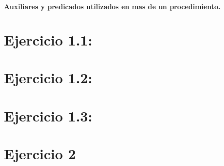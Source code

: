 \documentclass[10pt,a4paper]{article}
\begin{document}
\maketitle
\textbf{\Large{Auxiliares y predicados \small{utilizados en mas de un procedimiento.}}}\\

\section{Ejercicio 1.1:}

\section{Ejercicio 1.2:}

\pagebreak
\section{Ejercicio 1.3:}

\section{Ejercicio 2}


\end{document}

